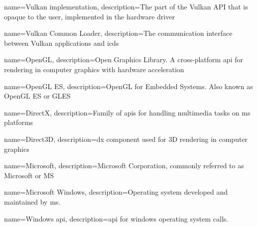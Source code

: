 {
  name={Vulkan implementation},
  description={The part of the Vulkan API that is opaque to the user, implemented in the hardware driver}
}

{
  name={Vulkan Common Loader},
  description={The communication interface between Vulkan applications and \glspl{icd}}
}

{
  name={OpenGL},
  description={Open Graphics Library. A cross-platform \gls{api} for rendering in computer graphics with hardware acceleration}
}

{
  name={OpenGL ES},
  description={OpenGL for Embedded Systems. Also known as OpenGL ES or GLES}
}

{
  name={DirectX},
  description={Family of \glspl{api} for handling multimedia tasks on \acrfull{ms} platforms}
}

{
  name={Direct3D},
  description={\gls{dx} component used for 3D rendering in computer graphics}
}

{
  name={Microsoft},
  description={Microsoft Corporation, commonly referred to as Microsoft or MS}
}

{
  name={Microsoft Windows},
  description={Operating system developed and maintained by \gls{ms}.}
}

{
  name={Windows \gls{api}},
  description={\gls{api} for \gls{windows} operating system calls.}
}
